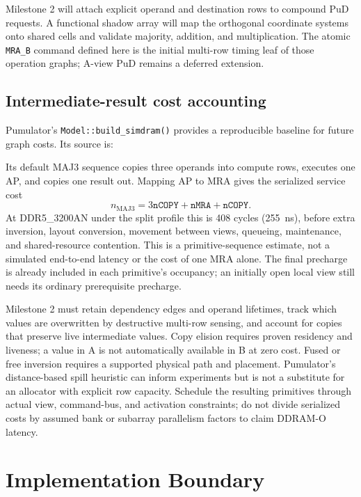 \documentclass[9pt,twocolumn]{extarticle}
\newcommand{\cmd}[1]{\texttt{#1}}
\newcommand{\param}[1]{\texttt{#1}}
\begin{document}
Milestone 2 will attach explicit operand and destination rows to compound PuD
requests. A functional shadow array will map the orthogonal coordinate systems
onto shared cells and validate majority, addition, and multiplication. The
atomic \cmd{MRA\_B} command defined here is the initial multi-row timing
leaf of those operation graphs; A-view PuD remains a deferred extension.

\subsection{Intermediate-result cost accounting}

Pumulator's \cmd{Model::build\_simdram()} provides a reproducible baseline
for future graph costs. Its source is:
{\raggedright\noindent
{}\par}
Its default MAJ3
sequence copies three operands into compute rows, executes one AP, and
copies one result out. Mapping AP to MRA gives the serialized service cost
\begin{equation}
 n_{\mathrm{MAJ3}}=3\param{nCOPY}+\param{nMRA}+\param{nCOPY}.
\end{equation}
At DDR5\_3200AN under the split profile this is 408 cycles (255~ns),
before extra inversion, layout conversion, movement between views, queueing,
maintenance, and shared-resource contention. This is a primitive-sequence
estimate, not a simulated end-to-end latency or the cost of one MRA alone.
The final precharge is already included in each primitive's occupancy;
an initially open local view still needs its ordinary prerequisite precharge.

Milestone 2 must retain dependency edges and operand lifetimes, track which
values are overwritten by destructive multi-row sensing, and account for
copies that preserve live intermediate values. Copy elision requires proven
residency and liveness; a value in A is not automatically available in B at
zero cost. Fused or free inversion requires a supported physical path and
placement. Pumulator's distance-based spill heuristic can inform experiments
but is not a substitute for an allocator with explicit row capacity.
Schedule the resulting primitives through actual view, command-bus, and
activation constraints; do not divide serialized costs by assumed bank or
subarray parallelism factors to claim DDRAM-O latency.

\section{Implementation Boundary}
\end{document}
